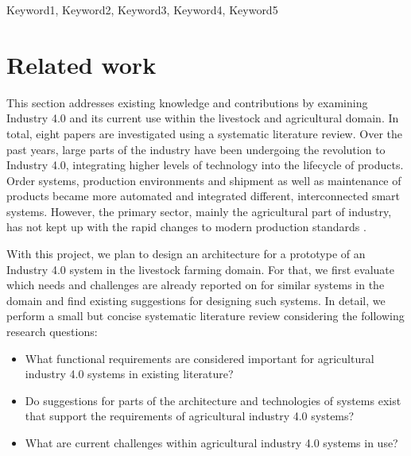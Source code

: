 \documentclass[conference]{IEEEtran}
\begin{document}
\maketitle
\IEEEpubidadjcol
\begin{abstract}





\end{abstract}

\begin{IEEEkeywords}
    Keyword1, Keyword2, Keyword3, Keyword4, Keyword5
\end{IEEEkeywords}



\vspace{1cm}



\section{Related work}
\label{sec:related_work}
This section addresses existing knowledge and contributions by examining Industry 4.0 and its current use within the livestock and agricultural domain. In total, eight papers are investigated using a systematic literature review.
\newline
Over the past years, large parts of the industry have been undergoing the revolution to Industry 4.0, integrating higher levels of technology into the lifecycle of products. Order systems, production environments and shipment as well as maintenance of products became more automated and integrated different, interconnected smart systems.
However, the primary sector, mainly the agricultural part of industry, has not kept up with the rapid changes to modern production standards \cite{pr7010036}.

With this project, we plan to design an architecture for a prototype of an Industry 4.0 system in the livestock farming domain. For that, we first evaluate which needs and challenges are already reported on for similar systems in the domain and find existing suggestions for designing such systems.
In detail, we perform a small but concise systematic literature review considering the following research questions:
\newline
\begin{itemize}
    \item What functional requirements are considered important for agricultural industry 4.0 systems in existing literature?
    \item Do suggestions for parts of the architecture and technologies of systems exist that support the requirements of agricultural industry 4.0 systems?
    \item What are current challenges within agricultural industry 4.0 systems in use?
\end{itemize}
\end{document}
